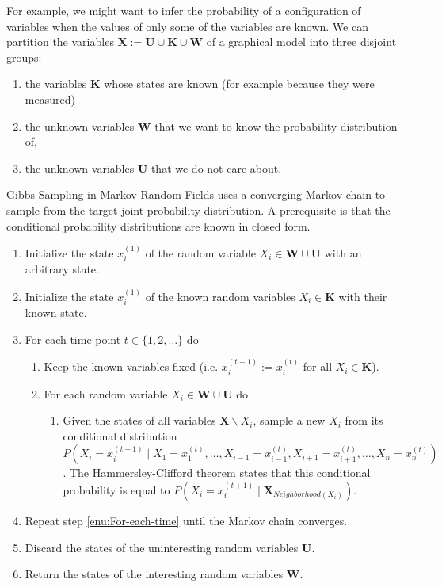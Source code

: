 For example, we might want to infer the probability of a configuration
of variables when the values of only some of the variables are known.
We can partition the variables $\mathbf{X}:=\mathbf{U}\cup\mathbf{K}\cup\mathbf{W}$
of a graphical model into three disjoint groups:
\begin{enumerate}
\item the variables $\mathbf{K}$ whose states are known (for example because
they were measured)
\item the unknown variables $\mathbf{W}$ that we want to know the probability
distribution of,
\item the unknown variables $\mathbf{U}$ that we do not care about.
\end{enumerate}
Gibbs Sampling in Markov Random Fields uses a converging Markov chain
to sample from the target joint probability distribution. A prerequisite
is that the conditional probability distributions are known in closed
form.
\begin{enumerate}
\item Initialize the state $x_{i}^{(1)}$ of the random variable $X_{i}\in\mathbf{W}\cup\mathbf{U}$
with an arbitrary state.
\item Initialize the state $x_{i}^{(1)}$ of the known random variables
$X_{i}\in\mathbf{K}$ with their known state.
\item \label{enu:For-each-time}For each time point $t\in\{1,2,\dots\}$
do

\begin{enumerate}
\item Keep the known variables fixed (i.e. $x_{i}^{(t+1)}:=x_{i}^{(t)}$
for all $X_{i}\in\mathbf{K}$).
\item For each random variable $X_{i}\in\mathbf{W}\cup\mathbf{U}$ do

\begin{enumerate}
\item Given the states of all variables $\mathbf{X}\backslash X_{i}$, sample
a new $X_{i}$ from its conditional distribution $P(X_{i}=x_{i}^{(t+1)}\mid X_{1}=x_{1}^{(t)},\dots,X_{i-1}=x_{i-1}^{(t)},X_{i+1}=x_{i+1}^{(t)},\dots,X_{n}=x_{n}^{(t)})$.
The Hammersley-Clifford theorem  states that this conditional probability
is equal to $P(X_{i}=x_{i}^{(t+1)}\mid\mathbf{X}_{Neighborhood(X_{i})})$.
\end{enumerate}
\end{enumerate}
\item Repeat step \ref{enu:For-each-time} until the Markov chain converges.
\item Discard the states of the uninteresting random variables $\mathbf{U}$.
\item Return the states of the interesting random variables $\mathbf{W}$.
\end{enumerate}

